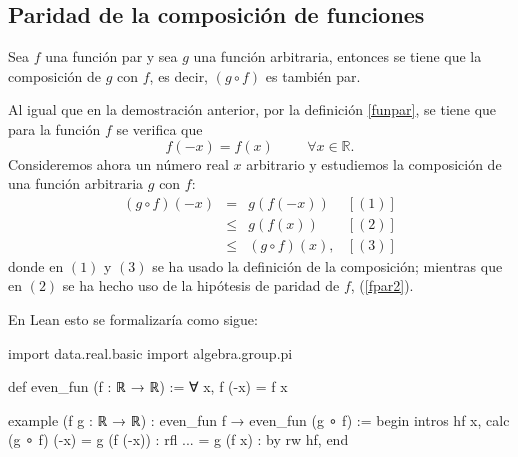 \subsection{Paridad de la composición de funciones}
\begin{teorema}
  Sea \(f\) una función par y sea \(g\) una función arbitraria,
  entonces se tiene que la composición de \(g\) con \(f\),
  es decir, \((g ∘ f)\) es también par.
\end{teorema}
\begin{demostracion}
  Al igual que en la demostración anterior, por
  la definición \ref{funpar}, se tiene que para la
  función \(f\) se verifica que
  \begin{equation}\label{fpar2}
  f(-x)=f(x) \hspace{1cm}∀ x ∈ ℝ.
  \end{equation}
  Consideremos ahora un número real \(x\) arbitrario y estudiemos
  la composición de una función arbitraria \(g\) con \(f\):
  \[\begin{array}{llll}
  	(g ∘ f)(-x) &= &g(f(-x))   & [(1)]\\
                    &≤ &g(f(x)) & [(2)] \\
                    &≤ &(g ∘ f)(x),& [(3)]
  \end{array}\]
  donde en \((1)\) y \((3)\) se ha usado la definición de la composición;
  mientras que en \((2)\) se ha hecho uso de la hipótesis de paridad
  de \(f\), (\ref{fpar2}).
\end{demostracion}

En Lean esto se formalizaría como sigue:
\begin{leancode}
import data.real.basic
import algebra.group.pi

def even_fun (f : ℝ → ℝ) := ∀ x, f (-x) = f x

example (f g : ℝ → ℝ) : even_fun f → even_fun (g ∘ f) :=
begin
intros hf x,
calc (g ∘ f) (-x)
    = g (f (-x)) : rfl
... = g (f x)    : by rw hf,
end
\end{leancode}

